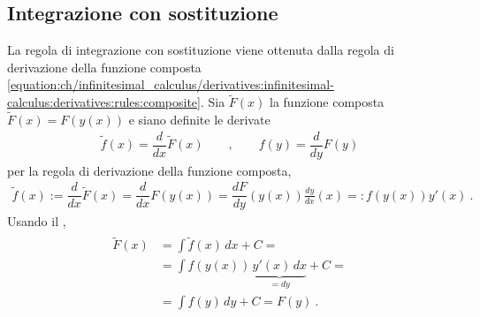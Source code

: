 \documentclass[letterpaper,10pt,italian]{jupyterBook}
\begin{document}
\subsection{Integrazione con sostituzione}
\label{\detokenize{ch/infinitesimal_calculus/integrals:integrazione-con-sostituzione}}\label{\detokenize{ch/infinitesimal_calculus/integrals:infinitesimal-calculus-integrals-substitution}}
\sphinxAtStartPar
La regola di integrazione con sostituzione viene ottenuta dalla regola di derivazione della funzione composta \eqref{equation:ch/infinitesimal_calculus/derivatives:infinitesimal-calculus:derivatives:rules:composite}. Sia \(\widetilde{F}(x)\) la funzione composta \(\widetilde{F}(x) = F( y(x) )\) e siano definite le derivate
\begin{equation*}
\begin{split}\widetilde{f}(x) = \dfrac{d}{dx} \widetilde{F}(x)  \qquad , \qquad
             f (y) = \dfrac{d}{dy}            F (y)\end{split}
\end{equation*}
\sphinxAtStartPar
per la regola di derivazione della funzione composta,
\begin{equation*}
\begin{split}\widetilde{f}(x) := \dfrac{d}{dx} \widetilde{F}(x) = \dfrac{d}{dx} F(y(x)) = 
\dfrac{d F}{d y}(y(x)) \frac{d y}{d x}(x) =: f(y(x)) y'(x) \ .\end{split}
\end{equation*}
\sphinxAtStartPar
Usando il {\hyperref[\detokenize{ch/infinitesimal_calculus/integrals:infinitesimal-calculus-integrals-thm-fund}]{}}, 
\begin{equation*}
\begin{split}\begin{aligned}
  \widetilde{F}(x) & = \int \widetilde{f}(x) \, dx + C = \\
                   & = \int f(y(x)) \, \underbrace{ y'(x) \, dx}_{= d y} + C = \\
                   & = \int f(y) \, dy + C = F(y) \ .
\end{aligned}\end{split}
\end{equation*}
\end{document}
